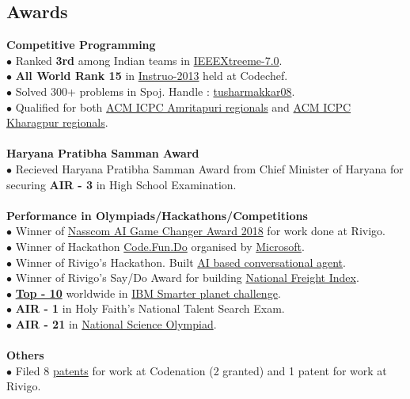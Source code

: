 \documentclass[margin,line]{resume}
\begin{document}
\begin{resume}
  \section{\mysidestyle \bf Awards}
  {\bf Competitive Programming } 
 \\$\bullet$ Ranked {\bfseries 3rd} among Indian teams in \href{http://www.ieee.org/membership_services/membership/students/competitions/xtreme/index.html}{IEEEXtreeme-7.0}.
    \\$\bullet$ {\bfseries All World Rank 15} in \href{http://www.codechef.com/rankings/INST2013/}{Instruo-2013} held at Codechef.
\\$\bullet$ Solved 300+ problems in Spoj. Handle :  \href{http://www.spoj.com/users/tusharmakkar08/}{tusharmakkar08}.
    \\$\bullet$ Qualified for both \href{icpc.amrita.ac.in}{ACM ICPC Amritapuri regionals} and \href{http://acm.iitkgp.ac.in/}{ACM ICPC Kharagpur regionals}.
\\\\    {\bf Haryana Pratibha Samman Award}
     \\$\bullet$ Recieved Haryana Pratibha Samman Award from Chief Minister of Haryana for securing {\bfseries AIR - 3} in High School Examination.
\\\\ {\bf Performance in Olympiads/Hackathons/Competitions}
    \\$\bullet$ Winner of \href{https://www.linkedin.com/feed/update/urn:li:activity:6425565017244037120/}{Nasscom AI Game Changer Award 2018} for work done at Rivigo.
     \\$\bullet$ Winner of Hackathon \href{https://www.acadaccelerator.com/Home/Events}{Code.Fun.Do} organised by \href{http://www.microsoft.com/en-in/msidc/default.aspx}{Microsoft}.
        \\$\bullet$ Winner of Rivigo's Hackathon. Built \href{https://eng.rivigo.com/technology/artificial-intelligence-based-conversational-agents/}{AI based conversational agent}.
            \\$\bullet$ Winner of Rivigo's Say/Do Award for building \href{https://nationalfreightindex.co.in/}{National Freight Index}.
    \\$\bullet$ \href{https://timesofindia.indiatimes.com/city/mangaluru/Mangalore-students-take-eco-literacy-online/articleshow/24455031.cms}{\bfseries{Top - 10}} worldwide in \href{http://www.ibm.com/ibm/history/ibm100/us/en/icons/smarterplanet/}{IBM Smarter planet challenge}.
\\$\bullet$ {\bfseries AIR - 1} in Holy Faith's National Talent Search Exam.
    \\$\bullet$ {\bfseries AIR - 21} in \href{http://www.sofworld.org/nso}{National Science Olympiad}.
    \\\\ {\bf Others}
\\$\bullet$ Filed 8 \href{https://patents.google.com/?inventor=Tushar+Makkar}{patents} for work at Codenation (2 granted) and 1 patent for work at Rivigo.


\end{resume}
\end{document}
